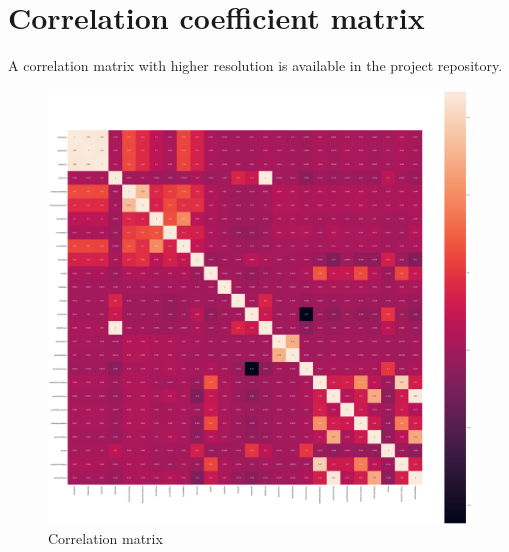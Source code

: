 \documentclass[\main/main.tex]{subfiles}
\begin{document}
\section{Correlation coefficient matrix}
A correlation matrix with higher resolution is available in the project repository.
\begin{figure}
  \includegraphics[width=\textwidth]{correlation_matrix}
  \caption{Correlation matrix}
\end{figure}
\end{document}
